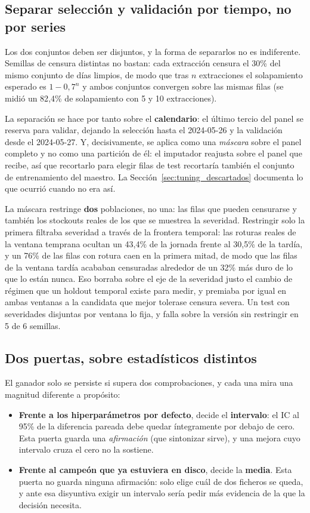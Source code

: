 \subsection*{Separar selección y validación por tiempo, no por series}

Los dos conjuntos deben ser disjuntos, y la forma de separarlos no es indiferente. Semillas de
censura distintas no bastan: cada extracción censura el 30\% del mismo conjunto de días limpios,
de modo que tras $n$ extracciones el solapamiento esperado es $1 - 0{,}7^n$ y ambos conjuntos
convergen sobre las mismas filas (se midió un 82{,}4\% de solapamiento con 5 y 10 extracciones).

La separación se hace por tanto sobre el \textbf{calendario}: el último tercio del panel se
reserva para validar, dejando la selección hasta el 2024-05-26 y la validación desde el
2024-05-27. Y, decisivamente, se aplica como una \emph{máscara} sobre el panel completo y no como
una partición de él: el imputador reajusta sobre el panel que recibe, así que recortarlo para
elegir filas de test recortaría también el conjunto de entrenamiento del maestro. La
Sección~\ref{sec:tuning_descartados} documenta lo que ocurrió cuando no era así.

La máscara restringe \textbf{dos} poblaciones, no una: las filas que pueden censurarse y también
los stockouts reales de los que se muestrea la severidad. Restringir solo la primera filtraba
severidad a través de la frontera temporal: las roturas reales de la ventana temprana ocultan un
43{,}4\% de la jornada frente al 30{,}5\% de la tardía, y un 76\% de las filas con rotura caen en
la primera mitad, de modo que las filas de la ventana tardía acababan censuradas alrededor de un
32\% más duro de lo que lo están nunca. Eso borraba sobre el eje de la severidad justo el cambio
de régimen que un holdout temporal existe para medir, y premiaba por igual en ambas ventanas a
la candidata que mejor tolerase censura severa. Un test con severidades disjuntas por ventana lo
fija, y falla sobre la versión sin restringir en 5 de 6 semillas.

\subsection*{Dos puertas, sobre estadísticos distintos}

El ganador solo se persiste si supera dos comprobaciones, y cada una mira una magnitud diferente
a propósito:

\begin{itemize}
    \item \textbf{Frente a los hiperparámetros por defecto}, decide el \textbf{intervalo}: el IC
    al 95\% de la diferencia pareada debe quedar íntegramente por debajo de cero. Esta puerta
    guarda una \emph{afirmación} (que sintonizar sirve), y una mejora cuyo intervalo cruza el
    cero no la sostiene.
    \item \textbf{Frente al campeón que ya estuviera en disco}, decide la \textbf{media}. Esta
    puerta no guarda ninguna afirmación: solo elige cuál de dos ficheros se queda, y ante esa
    disyuntiva exigir un intervalo sería pedir más evidencia de la que la decisión necesita.
\end{itemize}

